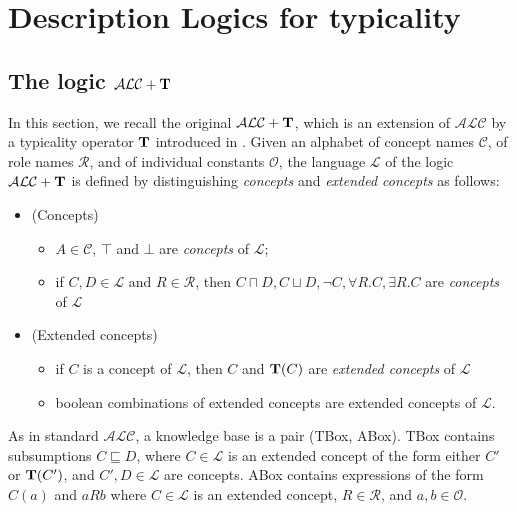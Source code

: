 \documentclass[a4paper, 11pt, oneside]{duthesis}
\newcommand{\tip}{{\bf T}}
\newcommand{\alc}{\mathcal{ALC}}
\newcommand{\alct}{\mathcal{ALC}+\tip}
\newcommand{\vero} {\top}
\newcommand{\elle} {\mathcal{L}}
\begin{document}

\chapter{Description Logics for typicality}\label{dlt}

\section{The logic $\alct$}\label{alct}


In this section, we recall the original $\alct$, which is an extension of $\alc$ by a typicality operator $\tip$ introduced in \cite{FI09}. Given an alphabet of concept names $\mathcal{C}$, of role names $\mathcal{R}$, and of individual constants $\mathcal{O}$, the language $\elle$ of the logic $\alct$ is defined by distinguishing \emph{concepts} and \emph{extended concepts} as follows:

\begin{itemize}
\item (Concepts)
  \begin{itemize}
     \item $A \in \mathcal{C}$, $\vero$ and $\bot$ are \emph{concepts} of
$\elle$;
    \item if $C, D \in \elle$ and $R \in \mathcal{R}$, then $C
\sqcap D, C \sqcup D, \neg C, \forall R.C, \exists R.C$ are
\emph{concepts} of $\elle$
  \end{itemize}
\item (Extended concepts)
    \begin{itemize}
       \item if $C$ is a
concept of $\elle$, then $C$ and $\tip(C)$ are \emph{extended concepts} of $\elle$
     \item boolean combinations of extended concepts are extended
concepts of $\elle$.
    \end{itemize}
\end{itemize}

\noindent  As in standard $\mathcal{ALC}$, a knowledge base is a pair (TBox, ABox). TBox contains subsumptions $C \sqsubseteq D$, where $C \in \elle$ is an extended concept of the form either $C'$ or $\tip(C')$, and $C', D \in \elle$ are concepts.
ABox contains expressions of the form $C(a)$ and $aRb$ where $C \in \elle$ is an extended concept, $R \in \mathcal{R}$, and $a, b \in \mathcal{O}$.
\end{document}
